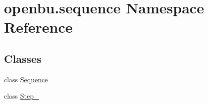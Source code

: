 \hypertarget{namespaceopenbu_1_1sequence}{}\section{openbu.\+sequence Namespace Reference}
\label{namespaceopenbu_1_1sequence}
\subsection*{Classes}
\begin{DoxyCompactItemize}
\item 
class \mbox{\hyperlink{classopenbu_1_1sequence_1_1_sequence}{Sequence}}
\item 
class \mbox{\hyperlink{classopenbu_1_1sequence_1_1_step__0}{Step\+\_}}
\end{DoxyCompactItemize}
